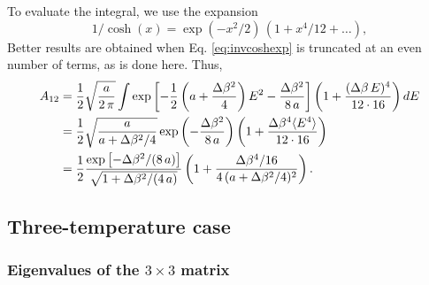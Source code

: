 \documentclass[aip,jcp,preprint,notitlepage, superscriptaddress]{revtex4-1}
\begin{document}
To evaluate the integral,
we use the expansion
\begin{equation}
1/\cosh(x)
=
\exp(-x^2/2) \,
(1 + x^4/12 + \dots),
\label{eq:invcoshexp}
\end{equation}
%
Better results are obtained
when Eq. \eqref{eq:invcoshexp}
is truncated at an even number of terms,
as is done here.
%
Thus,
\begin{align}
A_{12}
&=
\frac 1 2
\sqrt{ \frac a { 2 \, \pi } }
\int
  \exp\left[
    -\frac 1 2
      \left(
          a + \frac{\Delta \beta^2}{4}
      \right) E^2
    - \frac{
      \Delta \beta^2
    }{ 8 \, a }
  \right]
  \left(
    1 + \frac{ (\Delta \beta \, E)^4 } { 12 \cdot 16 }
  \right)
dE
\notag \\
&=
\frac 1 2
\sqrt{
  \frac{ a  }
  { a +  \Delta \beta^2/4 }
}
\exp\left(
  - \frac{
    \Delta \beta^2
  }{ 8 \, a }
\right)
\left(
  1 + \frac{ \Delta \beta^4 \langle E^4 \rangle}
  { 12 \cdot 16 }
\right)
\notag \\
&=
\frac 1 2
\frac
{
  \exp\left[
    - \Delta \beta^2 / (8 \, a)
  \right]
}
{
  \sqrt{1 +  \Delta \beta^2/(4 \, a) }
}
\left(
  1 + \frac{ \Delta \beta^4 / 16 }
  { 4 \, (a + \Delta \beta^2 / 4)^2}
\right).
\end{align}




\subsection{Three-temperature case}



\subsubsection{Eigenvalues of the $3\times 3$ matrix}
\end{document}
